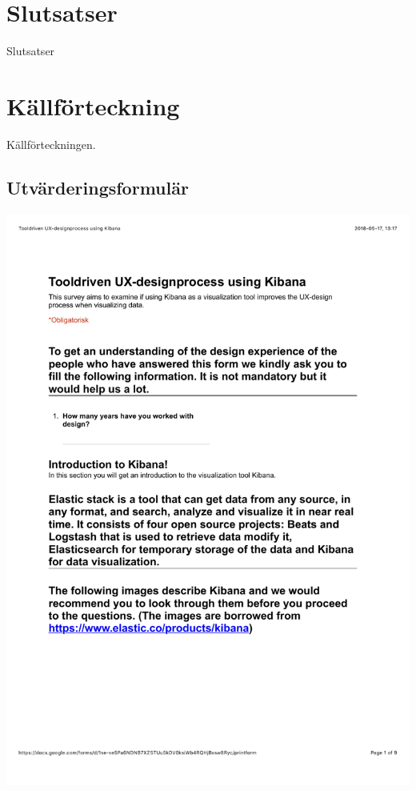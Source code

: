 \documentclass[12pt]{kththesis}
\begin{document}
\afterpage{\null\newpage}

\chapter{Slutsatser}
Slutsatser
\blindtext

\afterpage{\null\newpage}

\chapter{Källförteckning}
Källförteckningen.

\afterpage{\null\newpage}

\begin{appendices}
\renewcommand\thechapter{A}                     
\section{Utvärderingsformulär} 
\includegraphics[width=1\textwidth]{UX_designprocess1.pdf}

\end{appendices}
\end{document}

